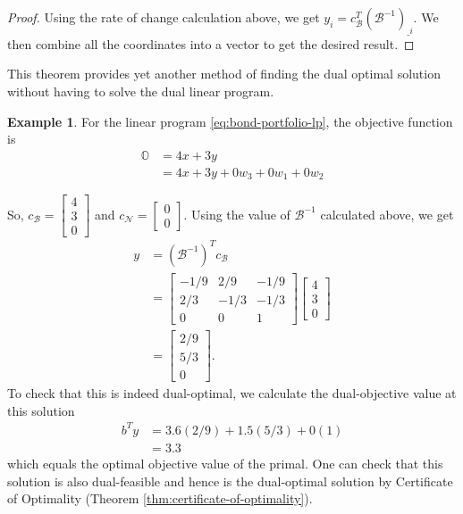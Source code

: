 \documentclass[
]{book}
\theoremstyle{definition}
\theoremstyle{definition}
\newtheorem{example}{Example}[chapter]
\theoremstyle{definition}
\theoremstyle{definition}
\theoremstyle{remark}
\begin{document}
\begin{proof}
Using the rate of change calculation above, we get \(y_i = c^T_{\mathcal{B}} (\mathcal{B}^{-1})_{\_i}\). We then combine all the coordinates into a vector to get the desired
result.
\end{proof}

This theorem provides yet another method of finding the dual optimal solution without having to solve the dual linear program.

\begin{example}
\protect\hypertarget{exm:dual-solution}{}\label{exm:dual-solution}For the linear program \eqref{eq:bond-portfolio-lp}, the objective function is
\begin{align*}
  \mathbb{O} & = 4 x + 3y \\
  & = 4x + 3y + 0 w_3 + 0 w_1 + 0 w_2 
\end{align*}

So, \(c_{\mathcal{B}} = \begin{bmatrix}4 \\ 3 \\ 0 \end{bmatrix}\) and \(c_{\mathcal{N}} = \begin{bmatrix}0 \\ 0 \end{bmatrix}\).
Using the value of \(\mathcal{B}^{-1}\) calculated above, we get
\begin{align*}
  y & = (\mathcal{B}^{-1})^Tc_{\mathcal{B}} \\
  & = 
    \begin{bmatrix}
    -1/9 & 2/9 & -1/9 \\
    2/3 & -1/3 & -1/3 \\
    0 & 0 & 1
    \end{bmatrix} 
    \begin{bmatrix}
      4 \\ 3 \\ 0
    \end{bmatrix}\\
  & = 
  \begin{bmatrix}
    2/9 \\ 5/3 \\ 0
  \end{bmatrix}.
\end{align*}
To check that this is indeed dual-optimal, we calculate the dual-objective value at this solution
\begin{align*}
  b^T y & = 3.6 (2/9) + 1.5 (5/3) + 0 (1) \\
  &= 3.3
\end{align*}
which equals the optimal objective value of the primal. One can check that this solution is also dual-feasible and hence is the dual-optimal solution by Certificate of Optimality (Theorem \ref{thm:certificate-of-optimality}).
\end{example}
\end{document}
